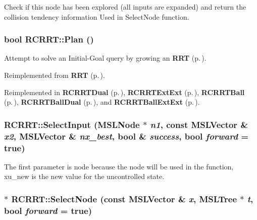 Check if this node has been explored (all inputs are expanded) and return the collision tendency information Used in Select\-Node function.

\subsubsection{\setlength{\rightskip}{0pt plus 5cm}bool RCRRT::Plan ()\hspace{0.3cm}{\tt  [virtual]}}\label{classRCRRT_a10}


Attempt to solve an Initial-Goal query by growing an {\bf RRT} {\rm (p.\,\pageref{classRRT})}.



Reimplemented from {\bf RRT} {\rm (p.\,\pageref{classRRT_a3})}.

Reimplemented in {\bf RCRRTDual} {\rm (p.\,\pageref{classRCRRTDual_a2})}, {\bf RCRRTExt\-Ext} {\rm (p.\,\pageref{classRCRRTExtExt_a2})}, {\bf RCRRTBall} {\rm (p.\,\pageref{classRCRRTBall_a5})}, {\bf RCRRTBall\-Dual} {\rm (p.\,\pageref{classRCRRTBallDual_a2})}, and {\bf RCRRTBall\-Ext\-Ext} {\rm (p.\,\pageref{classRCRRTBallExtExt_a2})}.
\subsubsection{ RCRRT::Select\-Input ({\bf MSLNode} $\ast$ {\em n1}, const {\bf MSLVector} \& {\em x2}, {\bf MSLVector} \& {\em nx\_\-best}, bool \& {\em success}, bool {\em forward} = true)\hspace{0.3cm}{\tt  [virtual]}}\label{classRCRRT_a8}


The first parameter is node because the node will be used in the function, xu\_\-new is the new value for the uncontrolled state.

\subsubsection{ $\ast$ RCRRT::Select\-Node (const {\bf MSLVector} \& {\em x}, {\bf MSLTree} $\ast$ {\em t}, bool {\em forward} = true)\hspace{0.3cm}{\tt  [virtual]}}\label{classRCRRT_a6}


